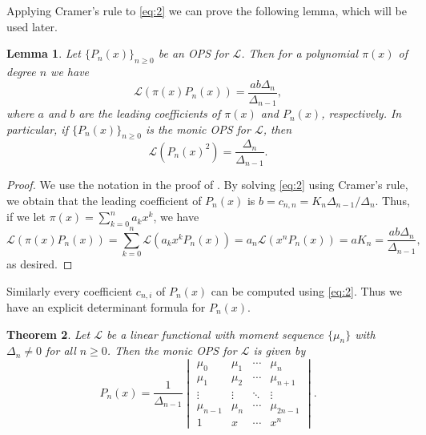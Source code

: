 \documentclass[oneside]{book}
\numberwithin{equation}{section}
\newtheorem{thm}{Theorem}[section]
\newtheorem{lem}[thm]{Lemma}
\theoremstyle{definition}
\newcommand\LL{\mathcal{L}}
\begin{document}
Applying Cramer's rule to \eqref{eq:2} we can prove the following
lemma, which will be used later.

\begin{lem}\label{lem:L(pi*P)}
  Let \( \{ P_n(x) \}_{n\ge 0} \) be an OPS for \( \LL \).
  Then for a polynomial \( \pi(x) \) of degree \( n \) we have
 \[
  \LL(\pi(x)P_n(x)) = \frac{ab\Delta_n}{\Delta_{n-1}},
\] 
where \( a \) and \( b \) are the leading coefficients of \( \pi(x) \)
and \( P_n(x) \), respectively. In particular, if
\( \{ P_n(x) \}_{n\ge 0} \) is the monic OPS for \( \LL \), then
\[
  \LL(P_n(x)^2) = \frac{\Delta_n}{\Delta_{n-1}}.
\]
\end{lem}
\begin{proof}
  We use the notation in the proof of . By solving
  \eqref{eq:2} using Cramer's rule, we obtain that the leading
  coefficient of \( P_n(x) \) is
  \( b= c_{n,n} = K_n \Delta_{n-1}/\Delta_n \). Thus, if we let
  \( \pi(x) = \sum_{k=0}^n a_k x^k \), we have
\[
  \LL(\pi(x)P_n(x)) = \sum_{k=0}^n \LL(a_{k}x^kP_n(x))
  = a_{n}\LL(x^n P_n(x)) = a K_n = \frac{ab\Delta_n}{\Delta_{n-1}},
\]
as desired.
\end{proof}

Similarly every coefficient \( c_{n,i} \) of \( P_n(x) \) can be
computed using \eqref{eq:2}. Thus we have an explicit determinant
formula for \( P_n(x) \).

\begin{thm}\label{thm:P=Hankel}
  Let \( \LL \) be a linear functional with moment sequence
  \( \{\mu_n\} \) with \( \Delta_n\ne 0 \) for all \( n\ge0 \).
  Then the monic OPS for \( \LL \) is given by
  \[
    P_n(x) = \frac{1}{\Delta_{n-1}}
    \begin{vmatrix}
      \mu_0 & \mu_1 & \cdots & \mu_n\\
      \mu_1 & \mu_2 & \cdots & \mu_{n+1}\\
      \vdots & \vdots & \ddots & \vdots\\
      \mu_{n-1} & \mu_{n} & \cdots & \mu_{2n-1}\\
      1 & x & \cdots & x^n
    \end{vmatrix}.
  \]
\end{thm}
\end{document}
